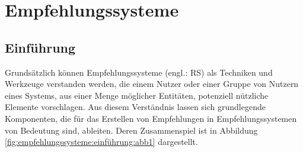 
\chapter{Empfehlungssysteme}
\label{ch:empfehlungssysteme}

\section{Einführung}
\label{ch:empfehlungssysteme:einführung}
Grundsätzlich können Empfehlungssysteme (engl.: \ac{RS}) als Techniken und Werkzeuge \cite[S. 4]{ricci:inbook}\cite[S. 1]{yadav:inproceedings} verstanden werden, die einem Nutzer oder einer Gruppe von Nutzern eines Systems, aus einer Menge möglicher Entitäten, potenziell nützliche Elemente vorschlagen.
Aus diesem Verständnis lassen sich grundlegende Komponenten, die für das Erstellen von Empfehlungen in Empfehlungssystemen von Bedeutung sind, ableiten.
Deren Zusammenspiel ist in Abbildung \ref{fig:empfehlungssysteme:einführung:abb1} dargestellt.

